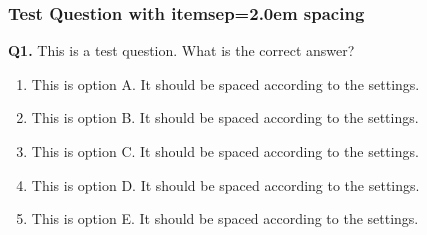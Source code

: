 \documentclass[
  letterpaper,
  DIV=11,
  numbers=noendperiod]{scrartcl}
\author{}
\date{}
\providecommand{\tightlist}{%
  \setlength{\itemsep}{0pt}\setlength{\parskip}{0pt}}
\def\tightlist{}
\begin{document}
\subsubsection{Test Question with itemsep=2.0em
spacing}\label{test-question-with-itemsep2.0em-spacing}

\textbf{Q1.} This is a test question. What is the correct answer?

\begin{enumerate}
\def\labelenumi{\alph{enumi}.}
\tightlist
\item
  This is option A. It should be spaced according to the settings.
\item
  This is option B. It should be spaced according to the settings.
\item
  This is option C. It should be spaced according to the settings.
\item
  This is option D. It should be spaced according to the settings.
\item
  This is option E. It should be spaced according to the settings.
\end{enumerate}
\end{document}
